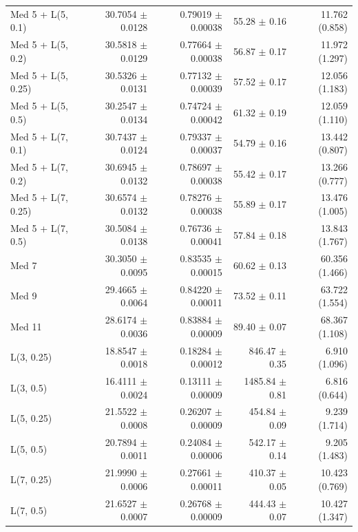 \begin{longtable}{lrrrr}
Med 5 + L(5, 0.1) & 30.7054 $\pm$ 0.0128 & 0.79019 $\pm$ 0.00038 & 55.28 $\pm$ 0.16 & 11.762 (0.858) \\
Med 5 + L(5, 0.2) & 30.5818 $\pm$ 0.0129 & 0.77664 $\pm$ 0.00038 & 56.87 $\pm$ 0.17 & 11.972 (1.297) \\
Med 5 + L(5, 0.25) & 30.5326 $\pm$ 0.0131 & 0.77132 $\pm$ 0.00039 & 57.52 $\pm$ 0.17 & 12.056 (1.183) \\
Med 5 + L(5, 0.5) & 30.2547 $\pm$ 0.0134 & 0.74724 $\pm$ 0.00042 & 61.32 $\pm$ 0.19 & 12.059 (1.110) \\
Med 5 + L(7, 0.1) & 30.7437 $\pm$ 0.0124 & 0.79337 $\pm$ 0.00037 & 54.79 $\pm$ 0.16 & 13.442 (0.807) \\
Med 5 + L(7, 0.2) & 30.6945 $\pm$ 0.0132 & 0.78697 $\pm$ 0.00038 & 55.42 $\pm$ 0.17 & 13.266 (0.777) \\
Med 5 + L(7, 0.25) & 30.6574 $\pm$ 0.0132 & 0.78276 $\pm$ 0.00038 & 55.89 $\pm$ 0.17 & 13.476 (1.005) \\
Med 5 + L(7, 0.5) & 30.5084 $\pm$ 0.0138 & 0.76736 $\pm$ 0.00041 & 57.84 $\pm$ 0.18 & 13.843 (1.767) \\
Med 7 & 30.3050 $\pm$ 0.0095 & 0.83535 $\pm$ 0.00015 & 60.62 $\pm$ 0.13 & 60.356 (1.466) \\
Med 9 & 29.4665 $\pm$ 0.0064 & 0.84220 $\pm$ 0.00011 & 73.52 $\pm$ 0.11 & 63.722 (1.554) \\
Med 11 & 28.6174 $\pm$ 0.0036 & 0.83884 $\pm$ 0.00009 & 89.40 $\pm$ 0.07 & 68.367 (1.108) \\
L(3, 0.25) & 18.8547 $\pm$ 0.0018 & 0.18284 $\pm$ 0.00012 & 846.47 $\pm$ 0.35 & 6.910 (1.096) \\
L(3, 0.5) & 16.4111 $\pm$ 0.0024 & 0.13111 $\pm$ 0.00009 & 1485.84 $\pm$ 0.81 & 6.816 (0.644) \\
L(5, 0.25) & 21.5522 $\pm$ 0.0008 & 0.26207 $\pm$ 0.00009 & 454.84 $\pm$ 0.09 & 9.239 (1.714) \\
L(5, 0.5) & 20.7894 $\pm$ 0.0011 & 0.24084 $\pm$ 0.00006 & 542.17 $\pm$ 0.14 & 9.205 (1.483) \\
L(7, 0.25) & 21.9990 $\pm$ 0.0006 & 0.27661 $\pm$ 0.00011 & 410.37 $\pm$ 0.05 & 10.423 (0.769) \\
L(7, 0.5) & 21.6527 $\pm$ 0.0007 & 0.26768 $\pm$ 0.00009 & 444.43 $\pm$ 0.07 & 10.427 (1.347) \\
\end{longtable}
\endgroup
